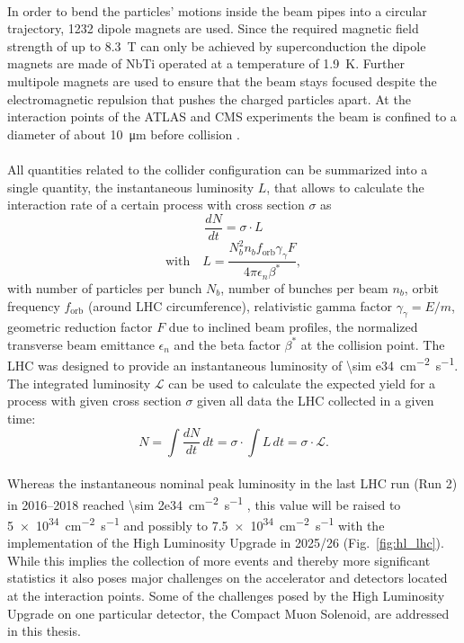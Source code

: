 \documentclass[../../main.tex]{subfiles}
\begin{document}
\\
In order to bend the particles' motions inside the beam pipes into a circular trajectory, 1232 dipole magnets are used. Since the required magnetic field strength of up to \SI{8.3}{T} can only be achieved by superconduction the dipole magnets are made of NbTi operated at a temperature of \SI{1.9}{K}. Further multipole magnets are used to ensure that the beam stays focused despite the electromagnetic repulsion that pushes the charged particles apart. At the interaction points of the ATLAS and CMS experiments the beam is confined to a diameter of about \SI{10}{\micro\metre} before collision \cite{lhc_ff}.\\
\\
All quantities related to the collider configuration can be summarized into a single quantity, the instantaneous luminosity $L$, that allows to calculate the interaction rate of a certain process with cross section $\sigma$ as
\begin{equation}
	\frac{dN}{dt} = \sigma \cdot L
\end{equation}
\begin{equation}
	\textrm{with}\quad L = \frac{N_{b}^2n_bf_\text{orb}\gamma_{\gamma} F}{4\pi \epsilon_n\beta^*},
\end{equation}
with number of particles per bunch $N_b$, number of bunches per beam $n_b$, orbit frequency $f_\text{orb}$ (around LHC circumference), relativistic gamma factor $\gamma_{\gamma} = E/m$, geometric reduction factor $F$ due to inclined beam profiles, the normalized transverse beam emittance $\epsilon_n$ and the beta factor $\beta^*$ at the collision point. The LHC was designed to provide an instantaneous luminosity of \SI{\sim e34}{cm^{-2}.s^{-1}}. The integrated luminosity $\mathcal{L}$ can be used to calculate the expected yield for a process with given cross section $\sigma$ given all data the LHC collected in a given time:
\begin{equation}
	N = \int \frac{dN}{dt} \, dt = \sigma\cdot \int L\,dt = \sigma\cdot\mathcal{L}.
\end{equation}
\\
Whereas the instantaneous nominal peak luminosity in the last LHC run (Run 2) in 2016--2018 reached \SI{\sim 2e34}{cm^{-2}s^{-1}} \cite{cern_wiki}, this value will be raised to \SI{5e34}{cm^{-2}s^{-1}} and possibly to \SI{7.5e34}{cm^{-2}s^{-1}} \cite{andre17} with the implementation of the High Luminosity Upgrade \cite{hl_lhc_tdr} in 2025/26 (Fig.~\ref{fig:hl_lhc}). While this implies the collection of more events and thereby more significant statistics it also poses major challenges on the accelerator and detectors located at the interaction points. Some of the challenges posed by the High Luminosity Upgrade on one particular detector, the Compact Muon Solenoid, are addressed in this thesis.
\end{document}

